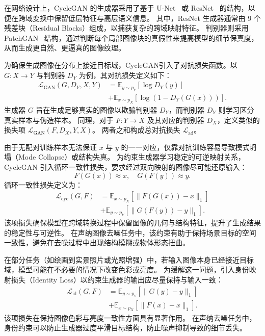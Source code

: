 在网络设计上，CycleGAN 的生成器采用了基于 U-Net~\cite{ronneberger2015u} 或 ResNet~\cite{johnson2016perceptual} 的结构，以便在跨域变换中保留低层特征与高层语义信息。
其中，ResNet 生成器通常由 $9$ 个残差块（Residual Blocks）组成，以捕获复杂的跨域映射特征。
判别器则采用 PatchGAN~\cite{isola2017image} 结构，通过判断每个局部图像块的真假性来提高模型的细节保真度，从而生成更自然、更逼真的图像纹理。

为确保生成图像在分布上接近目标域，CycleGAN引入了对抗损失函数。以 $G: X \rightarrow Y$ 与判别器 $D_Y$ 为例，其对抗损失定义如下：
\begin{equation}
    \label{eq1}
    \begin{aligned}
        \mathcal{L}_\mathrm{GAN}(G,D_Y,X,Y) &= \mathbb{E}_{y \sim p_Y}[\log D_Y(y)] \\
        &+ \mathbb{E}_{x \sim p_X}[\log (1-D_Y(G(x)))].
    \end{aligned}
\end{equation}
生成器 $G$ 旨在生成足够真实的图像以欺骗判别器 $D_Y$，而判别器 $D_Y$ 则学习区分真实样本与伪造样本。
同理，对于 $F: Y \rightarrow X$ 及其对应的判别器 $D_X$，定义类似的损失项 $\mathcal{L}_\mathrm{GAN}(F,D_X,Y,X)$。
两者之和构成总对抗损失 $\mathcal{L}_\mathrm{ad}$。

由于无配对训练样本无法保证 $x$ 与 $y$ 的一一对应，仅靠对抗训练容易导致模式坍塌（Mode Collapse）或结构失真。
为约束生成器学习稳定的可逆映射关系，CycleGAN 引入循环一致性损失，要求经过双向映射的图像尽可能还原输入：
\[
F(G(x)) \approx x, \quad G(F(y)) \approx y.
\]
循环一致性损失定义为：
\begin{equation}
    \label{eq2}
    \begin{aligned}
        \mathcal{L}_\mathrm{cyc}(G,F) &= \mathbb{E}_{x \sim p_X}[\|F(G(x))-x\|_1] \\
        &+ \mathbb{E}_{y \sim p_Y}[\|G(F(y))-y\|_1].
    \end{aligned}
\end{equation}
该项损失确保模型在跨域转换过程中保留图像的几何与结构特征，提升了生成结果的稳定性与可逆性。
在声纳图像去噪任务中，该约束有助于保持场景目标的空间一致性，避免在去噪过程中出现结构模糊或物体形态扭曲。

在部分任务（如绘画到实景照片或光照增强）中，若输入图像本身已经接近目标域，模型可能在不必要的情况下改变色彩或亮度。
为缓解这一问题，引入身份映射损失（Identity Loss）以约束生成器的输出应尽量保持与输入一致：
\begin{equation}
    \label{eq3}
    \begin{aligned}
        \mathcal{L}_\mathrm{id}(G,F) &= \mathbb{E}_{y \sim p_Y}[\|G(y)-y\|_1] \\
        &+ \mathbb{E}_{x \sim p_X}[\|F(x)-x\|_1].
    \end{aligned}
\end{equation}
该项损失在保持图像色彩与亮度一致性方面具有显著作用。
在声纳去噪任务中，身份约束可以防止生成器过度平滑目标结构，防止噪声抑制导致的细节丢失。


